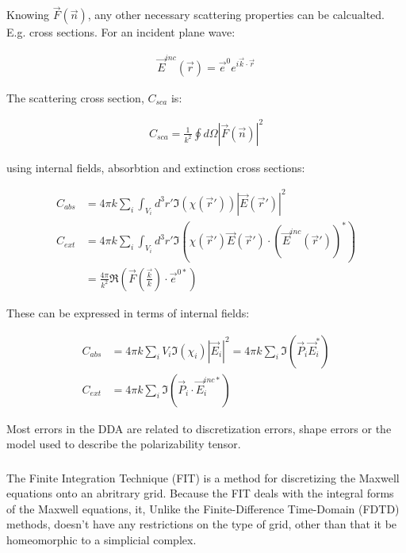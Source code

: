             Knowing $\vec{F}(\vec{n})$, any other necessary scattering properties can be calcualted. E.g. cross sections. For
            an incident plane wave:

            \begin{align}
                \vec{E}^{inc}(\vec{r}) = \vec{e}^0 e^{i\vec{k}\cdot\vec{r}}
            \end{align}

            The scattering cross section, $C_{sca}$ is:

            \begin{align}
                C_{sca} = \frac{1}{k^2}\oint d\Omega \left|\vec{F}(\vec{n})\right|^2
            \end{align}

            using internal fields, absorbtion and extinction cross sections:

            \begin{align}
                C_{abs} &= 4\pi k \sum_i \int_{V_i} d^3r' \Im(\chi(\vec{r}'))\left|\vec{E}(\vec{r}')\right|^2\\
                C_{ext} &= 4\pi k \sum_i \int_{V_i} d^3r' \Im\left(\chi(\vec{r}')\vec{E}(\vec{r}')\cdot(\vec{E}^{inc}(\vec{r}'))^*\right) \\
                &= \frac{4\pi}{k^2}\Re\left(\vec{F}(\frac{\vec{k}}{k})\cdot\vec{e}^{0*}\right)
            \end{align}

            These can be expressed in terms of internal fields:

            \begin{align}
                C_{abs} &= 4\pi k \sum_i V_i \Im(\chi_i)|\vec{E}_i|^2 = 4\pi k \sum_i \Im(\vec{P}_i\vec{E}_i^*) \\
                C_{ext} &= 4\pi k \sum_i \Im (\vec{P}_i\cdot\vec{E}_i^{inc*})
            \end{align}

            Most errors in the DDA are related to discretization errors, shape errors or the model used to describe the polarizability tensor.

        \subsubsection{}
        \label{subsec:FIT}
                The Finite Integration Technique (FIT) is a method for discretizing the Maxwell equations onto an abritrary
            grid\cite{weiland2001discrete}.  Because the FIT deals with the integral forms of the Maxwell equations, it,
            Unlike the Finite-Difference Time-Domain (FDTD) methods, doesn't have any restrictions on the type of grid,
            other than that it be homeomorphic to a simplicial complex.

